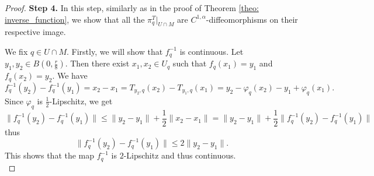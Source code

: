 \documentclass[11pt,reqno,a4paper]{article}%
\theoremstyle{definition}
\theoremstyle{remark}
\renewcommand{\leq}{\leqslant}
\begin{document}
\begin{proof}
    \noindent \textbf{Step 4.}
    In this step, similarly as in the proof of Theorem \ref{theo: inverse_function}, we show that all the $\pi_{q}^T |_{U \cap M}$ are $C^{1,\alpha}$-diffeomorphisms on their respective image.
    
    \noindent We fix $q \in U \cap M$.
    Firstly, we will show that $f_q^{-1}$ is continuous. Let $y_1,y_2 \in B(0,\frac{r}{8})$. Then there exist $x_1,x_2 \in U_q$ such that $f_q(x_1) = y_1$ and $f_q(x_2) = y_2$.
    We have
    \[ f_q^{-1}(y_2) - f_q^{-1}(y_1) = x_2 - x_1 = T_{y_2,q}(x_2) - T_{y_1,q}(x_1) = y_2 - \varphi_q(x_2) - y_1 + \varphi_q(x_1). \]
    Since $\varphi_q$ is $\frac{1}{2}$-Lipschitz, we get
    \[ \| f_q^{-1}(y_2) - f_q^{-1}(y_1) \| \leq \| y _2 - y_1 \| + \frac{1}{2} \| x_2 - x_1\| = \| y _2 - y_1 \| + \frac{1}{2} \| f_q^{-1}(y_2) - f_q^{-1}(y_1) \| \]
    thus
    \begin{equation*} 
        \| f_q^{-1}(y_2) - f_q^{-1}(y_1) \| \leq 2 \| y _2 - y_1 \|.
    \end{equation*}
    This shows that the map $f_q^{-1}$ is $2$-Lipschitz and thus continuous. \\


\end{proof}
\end{document}
